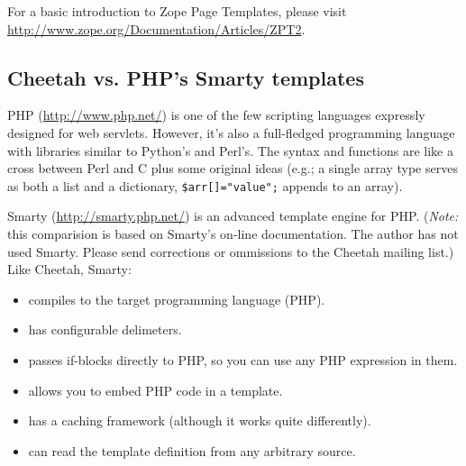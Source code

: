 For a basic introduction to Zope Page Templates, please visit
\url{http://www.zope.org/Documentation/Articles/ZPT2}.

\subsection{Cheetah vs. PHP's Smarty templates}
\label{comparisons.smarty}

PHP (\url{http://www.php.net/}) is one of the few scripting languages
expressly designed for web servlets.  However, it's also a full-fledged
programming language with libraries similar to Python's and Perl's.  The
syntax and functions are like a cross between Perl and C plus some original
ideas (e.g.; a single array type serves as both a list and a dictionary,
\verb+$arr[]="value";+ appends to an array).

Smarty (\url{http://smarty.php.net/}) is an advanced template engine for
PHP.  ({\em Note:} this comparision is based on Smarty's on-line documentation.
The author has not used Smarty.  Please send corrections or ommissions to the
Cheetah mailing list.)  Like Cheetah, Smarty:

\begin{itemize}
\item compiles to the target programming language (PHP).
\item has configurable delimeters.
\item passes if-blocks directly to PHP, so you can use any PHP expression in
them.
\item allows you to embed PHP code in a template.
\item has a caching framework (although it works quite differently).
\item can read the template definition from any arbitrary source.
\end{itemize}

